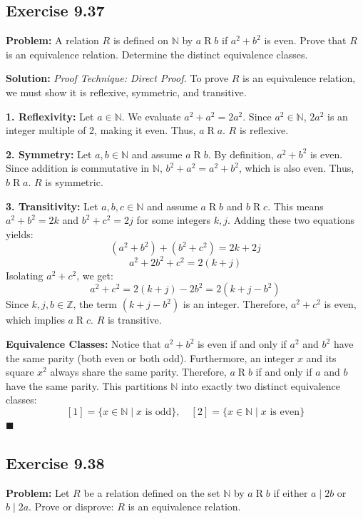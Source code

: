 \documentclass[11pt, a4paper]{article}
\theoremstyle{definition}
\theoremstyle{remark}
\newcommand{\N}{\mathbb{N}}
\newcommand{\Z}{\mathbb{Z}}
\begin{document}
\subsection*{Exercise 9.37}
\textbf{Problem:} A relation $R$ is defined on $\N$ by $a \mathrel{R} b$ if $a^2 + b^2$ is even. Prove that $R$ is an equivalence relation. Determine the distinct equivalence classes.

\textbf{Solution:}
\textit{Proof Technique: Direct Proof.}
To prove $R$ is an equivalence relation, we must show it is reflexive, symmetric, and transitive.

\textbf{1. Reflexivity:} Let $a \in \N$. We evaluate $a^2 + a^2 = 2a^2$. Since $a^2 \in \N$, $2a^2$ is an integer multiple of 2, making it even. Thus, $a \mathrel{R} a$. $R$ is reflexive.

\textbf{2. Symmetry:} Let $a, b \in \N$ and assume $a \mathrel{R} b$. By definition, $a^2 + b^2$ is even. Since addition is commutative in $\N$, $b^2 + a^2 = a^2 + b^2$, which is also even. Thus, $b \mathrel{R} a$. $R$ is symmetric.

\textbf{3. Transitivity:} Let $a, b, c \in \N$ and assume $a \mathrel{R} b$ and $b \mathrel{R} c$. 
This means $a^2 + b^2 = 2k$ and $b^2 + c^2 = 2j$ for some integers $k, j$. 
Adding these two equations yields:
\[
    (a^2 + b^2) + (b^2 + c^2) = 2k + 2j
\]
\[
    a^2 + 2b^2 + c^2 = 2(k + j)
\]
Isolating $a^2 + c^2$, we get:
\[
    a^2 + c^2 = 2(k + j) - 2b^2 = 2(k + j - b^2)
\]
Since $k, j, b \in \Z$, the term $(k + j - b^2)$ is an integer. Therefore, $a^2 + c^2$ is even, which implies $a \mathrel{R} c$. $R$ is transitive.

\textbf{Equivalence Classes:}
Notice that $a^2 + b^2$ is even if and only if $a^2$ and $b^2$ have the same parity (both even or both odd). Furthermore, an integer $x$ and its square $x^2$ always share the same parity. Therefore, $a \mathrel{R} b$ if and only if $a$ and $b$ have the same parity.
This partitions $\N$ into exactly two distinct equivalence classes:
\[
    [1] = \{ x \in \N \mid x \text{ is odd} \}, \quad [2] = \{ x \in \N \mid x \text{ is even} \}
\]
$\blacksquare$

\subsection*{Exercise 9.38}
\textbf{Problem:} Let $R$ be a relation defined on the set $\N$ by $a \mathrel{R} b$ if either $a \mid 2b$ or $b \mid 2a$. Prove or disprove: $R$ is an equivalence relation.
\end{document}
